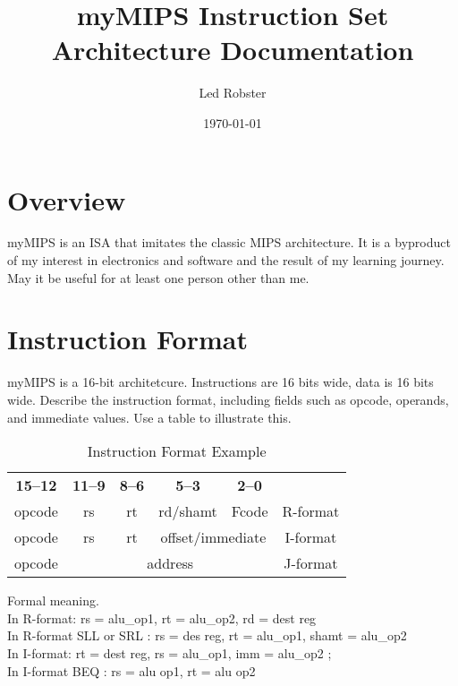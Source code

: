 \documentclass[a4paper,11pt]{article}
\title{\textbf{myMIPS Instruction Set Architecture Documentation}}
\author{Led Robster}
\date{\today}
\begin{document}
	
	\maketitle
	
	\section*{Overview}
	myMIPS is an ISA that imitates the classic MIPS architecture. It is a byproduct of my interest in electronics and software and the result of my learning journey. May it be useful for at least one person other than me.
	
	\section*{Instruction Format}
	myMIPS is a 16-bit architetcure. Instructions are 16 bits wide, data is 16 bits wide. 
	Describe the instruction format, including fields such as opcode, operands, and immediate values. Use a table to illustrate this.
	
\begin{table}[h!]
	\centering
	\setlength{\arrayrulewidth}{0.8mm} %
	\setlength{\tabcolsep}{3pt} %
	\renewcommand{\arraystretch}{1.4} %
	\begin{tabular}{|c|c|c|c|c|c}
		\cline{1-5}
		\textbf{15--12} & \textbf{11--9} & \textbf{8--6} & \textbf{5--3} & \textbf{2--0} & \\ \cline{1-5}
		opcode & rs & rt & rd/shamt & Fcode & R-format\\ \cline{1-5}
		opcode & rs & rt & \multicolumn{2}{c|}{offset/immediate} & I-format \\ \cline{1-5}
		opcode & \multicolumn{4}{c|}{address} & J-format\\ \cline{1-5}
	\end{tabular}
	\caption{Instruction Format Example}
	\label{tab:instruction_format}
\end{table}
	
	Formal meaning. \\
	In R-format: rs = alu\_op1, rt = alu\_op2, rd = dest reg  \\
		\hspace*{2em} In R-format SLL or SRL : rs = des reg, rt = alu\_op1, shamt = alu\_op2  \\
	In I-format: rt = dest reg, rs = alu\_op1, imm = alu\_op2 ;  \\
		\hspace*{2em} In I-format BEQ : rs = alu op1, rt = alu op2
	
\end{document}
